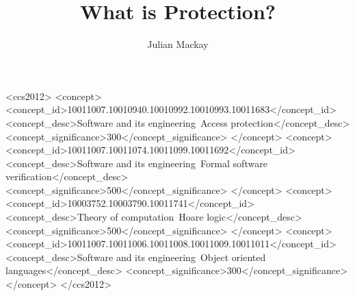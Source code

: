 \documentclass[acmsmall,review,anonymous,screen]{acmart}\settopmatter{printfolios=true,printacmref=false}
\begin{document}
\title{What is Protection?}


\author{Julian Mackay}

 



  

\begin{CCSXML}
<ccs2012>
   <concept>
       <concept_id>10011007.10010940.10010992.10010993.10011683</concept_id>
       <concept_desc>Software and its engineering~Access protection</concept_desc>
       <concept_significance>300</concept_significance>
       </concept>
   <concept>
       <concept_id>10011007.10011074.10011099.10011692</concept_id>
       <concept_desc>Software and its engineering~Formal software verification</concept_desc>
       <concept_significance>500</concept_significance>
       </concept>
   <concept>
       <concept_id>10003752.10003790.10011741</concept_id>
       <concept_desc>Theory of computation~Hoare logic</concept_desc>
       <concept_significance>500</concept_significance>
       </concept>
   <concept>
       <concept_id>10011007.10011006.10011008.10011009.10011011</concept_id>
       <concept_desc>Software and its engineering~Object oriented languages</concept_desc>
       <concept_significance>300</concept_significance>
       </concept>
 </ccs2012>
\end{CCSXML}
\end{document}
